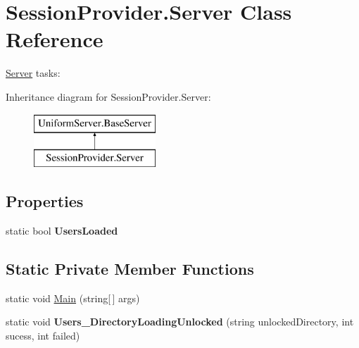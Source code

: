 \hypertarget{class_session_provider_1_1_server}{}\section{Session\+Provider.\+Server Class Reference}
\label{class_session_provider_1_1_server}


\mbox{\hyperlink{class_session_provider_1_1_server}{Server}} tasks\+:  


Inheritance diagram for Session\+Provider.\+Server\+:\begin{figure}[H]
\begin{center}
\leavevmode
\includegraphics[height=2.000000cm]{d8/d17/class_session_provider_1_1_server}
\end{center}
\end{figure}
\subsection*{Properties}
\begin{DoxyCompactItemize}
\item 
\mbox{\label{class_session_provider_1_1_server_a7ccb7c8e5465c2778d961034fcd6ac6f}} 
static bool {\bfseries Users\+Loaded}
\end{DoxyCompactItemize}
\subsection*{Static Private Member Functions}
\begin{DoxyCompactItemize}
\item 
static void \mbox{\hyperlink{class_session_provider_1_1_server_a78068e966b78f7579b01ba80f53b87ea}{Main}} (string\mbox{[}$\,$\mbox{]} args)
\item 
\mbox{\label{class_session_provider_1_1_server_ad75d498e5203fe80a725f54ec955ace2}} 
static void {\bfseries Users\+\_\+\+Directory\+Loading\+Unlocked} (string unlocked\+Directory, int sucess, int failed)
\end{DoxyCompactItemize}

